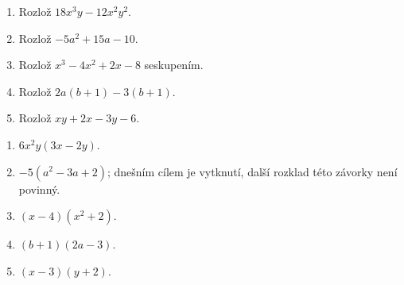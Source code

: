 \documentclass[11pt,a4paper]{article}
\begin{document}

\begin{zadaniReseniBox}[title={Domácí úlohy},breakable=false]
\begin{enumerate}[label=\alph*)]
\item Rozlož $18x^3y-12x^2y^2$.
\item Rozlož $-5a^2+15a-10$.
\item Rozlož $x^3-4x^2+2x-8$ seskupením.
\item Rozlož $2a(b+1)-3(b+1)$.
\item Rozlož $xy+2x-3y-6$.
\end{enumerate}
\tcblower
\begin{enumerate}[label=\alph*)]
\item $6x^2y(3x-2y)$.
\item $-5(a^2-3a+2)$; dnešním cílem je vytknutí, další rozklad této závorky není povinný.
\item $(x-4)(x^2+2)$.
\item $(b+1)(2a-3)$.
\item $(x-3)(y+2)$.
\end{enumerate}
\end{zadaniReseniBox}
\end{document}
